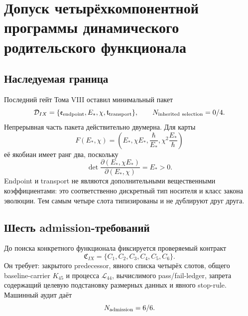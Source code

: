 \chapter{Допуск четырёхкомпонентной программы динамического родительского функционала}
\label{ch:v9-four-slot-program-admission}

\section{Наследуемая граница}

Последний гейт Тома VIII оставил минимальный пакет
\begin{equation}
 \mathcal D_{IX}=\{\mathfrak e_{\rm endpoint},E_*,\chi,
 \mathfrak t_{\rm transport}\},
 \qquad N_{\rm inherited\ selection}=0/4.
 \label{eq:v9-admission-inherited-data}
\end{equation}
Непрерывная часть пакета действительно двумерна. Для карты
\begin{equation}
 F(E_*,\chi)=\left(E_*,\chi E_*,\frac{\hbar}{E_*},
 \chi^2\frac{E_*}{\hbar}\right)
 \label{eq:v9-admission-continuous-map}
\end{equation}
её якобиан имеет ранг два, поскольку
\begin{equation}
 \det\frac{\partial(E_*,\chi E_*)}{\partial(E_*,\chi)}=E_*>0.
 \label{eq:v9-admission-jacobian-minor}
\end{equation}
Endpoint и transport не являются дополнительными вещественными
коэффициентами: это соответственно дискретный тип носителя и класс закона
эволюции. Тем самым четыре слота типизированы и не дублируют друг друга.

\section{Шесть admission-требований}

До поиска конкретного функционала фиксируется проверяемый контракт
\begin{equation}
 \mathfrak C_{IX}=\{C_1,C_2,C_3,C_4,C_5,C_6\}.
 \label{eq:v9-admission-contract}
\end{equation}
Он требует: закрытого predecessor, явного списка четырёх слотов, общего
baseline-carrier $K_{45}$ и процесса $\mathcal L_{44}$, вычислимого
pass/fail-ledger, запрета содержащий целевую подстановку размерных данных и явного
stop-rule. Машинный аудит даёт
\begin{equation}
 N_{\rm admission}=6/6.
 \label{eq:v9-admission-ledger}
\end{equation}

